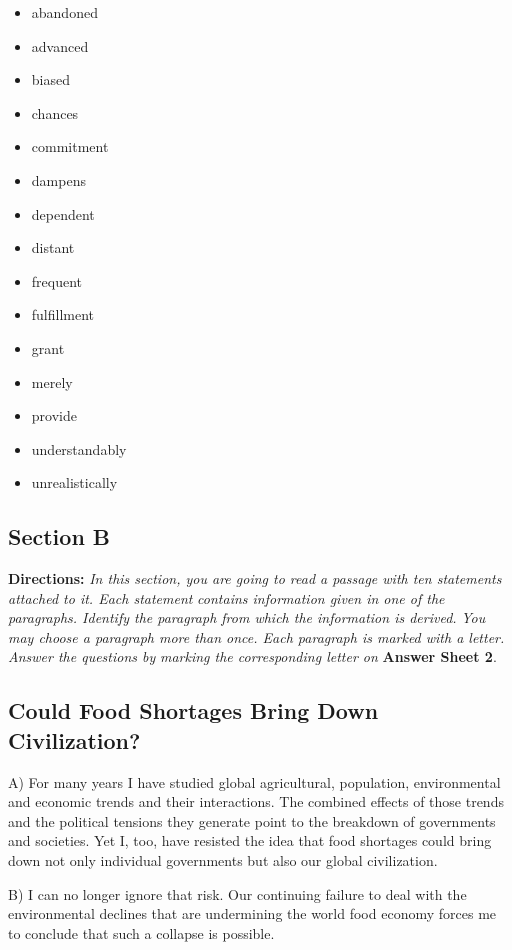\documentclass[UTF8,11pt]{ctexart}
\begin{document}
\begin{itemize}[leftmargin=2em,itemsep=.2em,topsep=.4em]\item[A.] abandoned
\item[B.] advanced
\item[C.] biased
\item[D.] chances
\item[E.] commitment
\item[F.] dampens
\item[G.] dependent
\item[H.] distant
\item[I.] frequent
\item[J.] fulfillment
\item[K.] grant
\item[L.] merely
\item[M.] provide
\item[N.] understandably
\item[O.] unrealistically
\end{itemize}

\subsection*{\textbf{Section B}}


\textbf{Directions:}\textit{ In this section, you are going to read a passage with ten statements attached to it. Each statement} \textit{contains information given in one of the paragraphs. Identify the paragraph from which the information is derived.} \textit{You may choose a paragraph more than once. Each paragraph is marked with a letter. Answer the questions by} \textit{marking the corresponding letter on}\textbf{ Answer Sheet 2}.


\subsection*{\textbf{Could Food Shortages Bring Down Civilization?}}


A) For many years I have studied global agricultural, population, environmental and economic trends and their interactions. The combined effects of those trends and the political tensions they generate point to the breakdown of governments and societies. Yet I, too, have resisted the idea that food shortages could bring down not only individual governments but also our global civilization.


B) I can no longer ignore that risk. Our continuing failure to deal with the environmental declines that are undermining the world food economy forces me to conclude that such a collapse is possible.
\end{document}
